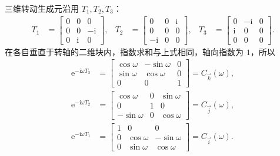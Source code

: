 三维转动生成元沿用 $T_1,T_2,T_3$：
\begin{align}
T_1&=\begin{bmatrix}0&0&0\\0&0&-\mathrm{i}\\0&\mathrm{i}&0\end{bmatrix},&
T_2&=\begin{bmatrix}0&0&\mathrm{i}\\0&0&0\\-\mathrm{i}&0&0\end{bmatrix},&
T_3&=\begin{bmatrix}0&-\mathrm{i}&0\\\mathrm{i}&0&0\\0&0&0\end{bmatrix}.
\end{align}
在各自垂直于转轴的二维块内，指数求和与上式相同，轴向指数为 $1$，所以
\begin{align}
\mathrm{e}^{-\mathrm{i}\omega T_3}&=\begin{bmatrix}\cos\omega&-\sin\omega&0\\\sin\omega&\cos\omega&0\\0&0&1\end{bmatrix}=C_{\vec k}\left(\omega\right),\\
\mathrm{e}^{-\mathrm{i}\omega T_2}&=\begin{bmatrix}\cos\omega&0&\sin\omega\\0&1&0\\-\sin\omega&0&\cos\omega\end{bmatrix}=C_{\vec j}\left(\omega\right),\\
\mathrm{e}^{-\mathrm{i}\omega T_1}&=\begin{bmatrix}1&0&0\\0&\cos\omega&-\sin\omega\\0&\sin\omega&\cos\omega\end{bmatrix}=C_{\vec i}\left(\omega\right).
\end{align}


